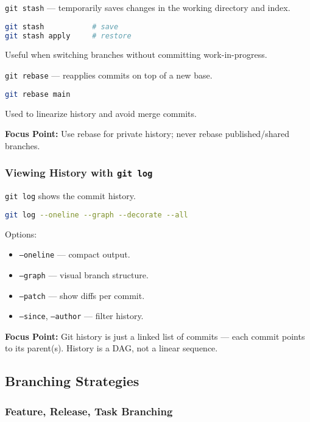 \documentclass[a4paper,12pt]{article}
\begin{document}
\texttt{git stash} — temporarily saves changes in the working directory and index.

\begin{lstlisting}[language=bash]
git stash           # save
git stash apply     # restore
\end{lstlisting}

Useful when switching branches without committing work-in-progress.

\texttt{git rebase} — reapplies commits on top of a new base.

\begin{lstlisting}[language=bash]
git rebase main
\end{lstlisting}

Used to linearize history and avoid merge commits.

\textbf{Focus Point:} Use rebase for private history; never rebase published/shared branches.

\subsubsection{Viewing History with \texttt{git log}}

\texttt{git log} shows the commit history.

\begin{lstlisting}[language=bash]
git log --oneline --graph --decorate --all
\end{lstlisting}

Options:
\begin{itemize}
  \item \texttt{--oneline} — compact output.
  \item \texttt{--graph} — visual branch structure.
  \item \texttt{--patch} — show diffs per commit.
  \item \texttt{--since}, \texttt{--author} — filter history.
\end{itemize}

\textbf{Focus Point:} Git history is just a linked list of commits — each commit points to its parent(s). History is a DAG, not a linear sequence.

\subsection{Branching Strategies}

\subsubsection{Feature, Release, Task Branching}
\end{document}
